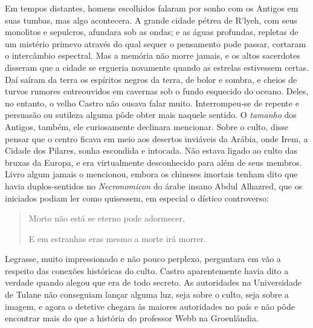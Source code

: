 \begin{pages}
\begin{Rightside}
Em tempos distantes, homens escolhidos falaram por sonho com os Antigos
em suas tumbas, mas algo acontecera. A grande cidade pétrea de R'lyeh,
com seus monolitos e sepulcros, afundara sob as ondas; e as águas
profundas, repletas de um mistério primevo através do qual sequer o
pensamento pode passar, cortaram o intercâmbio espectral. Mas a memória
não morre jamais, e os altos sacerdotes disseram que a cidade se
ergueria novamente quando as estrelas estivessem certas. Daí saíram da
terra os espíritos negros da terra, de bolor e sombra, e cheios de
turvos rumores entreouvidos em cavernas sob o fundo esquecido do oceano.
Deles, no entanto, o velho Castro não ousava falar muito. Interrompeu-se
de repente e persuasão ou sutileza alguma pôde obter mais naquele
sentido. O \emph{tamanho} dos Antigos, também, ele curiosamente
declinara mencionar. Sobre o culto, disse pensar que o centro ficava em
meio aos desertos inviáveis da Arábia, onde Irem, a Cidade dos
Pilares, sonha escondida e
intocada. Não estava ligado ao culto das bruxas da Europa, e era
virtualmente desconhecido para além de seus membros. Livro algum jamais
o mencionou, embora os chineses imortais tenham dito que havia
duplos-sentidos no \emph{Necronomicon} do árabe insano Abdul Alhazred, que os iniciados podiam ler
como quisessem, em especial o dístico controverso:

\begin{quote}
\forceindent{}Morto não está se eterno pode adormecer,

E em estranhas eras mesmo a morte irá morrer.
\end{quote}

Legrasse, muito impressionado e não pouco perplexo, perguntara em vão a
respeito das conexões históricas do culto. Castro aparentemente havia
dito a verdade quando alegou que era de todo secreto. As autoridades na
Universidade de Tulane não conseguiam lançar alguma luz, seja sobre o
culto, seja sobre a imagem, e agora o detetive chegara às maiores
autoridades no país e não pôde encontrar mais do que a história do
professor Webb na Groenlândia.


\end{Rightside}
\end{pages}
